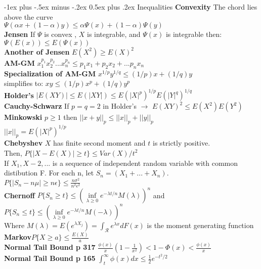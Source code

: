 \documentclass[10pt,landscape]{article}
\makeatletter
\renewcommand{\section}{\@startsection{section}{1}{0mm}%
                                {-1ex plus -.5ex minus -.2ex}%
                                {0.5ex plus .2ex}%
                                {\normalfont\large\bfseries}}
\makeatother
\begin{document}
\begin{multicols*}{3}
\section{Inequalities}
\textbf{Convexity} The chord lies above the curve\\
$\Psi(\alpha x +(1-\alpha)y)\leq \alpha\Psi(x)+(1-\alpha)\Psi(y)$\\
\textbf{Jensen} If $\Psi$ is convex , $X$ is integrable, and $\Psi(x)$ is integrable then:
$\Psi(E(x))\leq E(\Psi(x))$\\
\textbf{Another of Jensen} $E(X^2)\geq E(X)^2$\\
\textbf{AM-GM} $ x_1^{p_1} x_2^{p_2}...x_n^{p_n}\leq p_1 x_1 +p_2 x_2 + ... p_n x_n$\\
\textbf{Specialization of AM-GM} $x^{1/p} y^{1/q} \leq (1/p) x +(1/q) y$\\
simplifies to: $ xy \leq (1/p) x^p +(1/q) y^p$\\
\textbf{Holder's} $|E(XY)| \leq E(|XY|) \leq E(|X|^p)^{1/p} E(|Y|^q)^{1/q}$\\ 
\textbf{Cauchy-Schwarz} If $p=q=2$ in Holder's $\rightarrow$ $E(XY)^2 \leq E(X^2)E(Y^2)$\\
\textbf{Minkowski} $p\geq 1$ then $ ||x+y||_p \leq ||x||_p + ||y||_p$\\
$||x||_p=E(|X|^p)^{1/p}$\\
\textbf{Chebyshev} $X$ has finite second moment and $t$ is strictly positive.\\
Then, $P\{|X-E(X)|\geq t\}\leq Var(X)/t^{2}$\\
If $X_1,X-2,...$ is a sequence of independent random variable with common distibution F. For each n, let $S_n=(X_1+...+X_n)$.\\
$P\{|S_n-n\mu|\geq n\epsilon\}\leq \frac{n\sigma^2}{n^2\epsilon^2}$\\
\textbf{Chernoff} $P\{S_n\geq t\} \leq (\inf\limits_{\lambda\geq 0} e^{-\lambda t/n}M(\lambda))^n $ and\\
$P\{S_n\leq t\} \leq (\inf\limits_{\lambda\geq 0} e^{-\lambda t/n}M(-\lambda))^n $\\ 
Where $M(\lambda)=E(e^{\lambda X_j})=\int_{\mathcal{R}} e^{\lambda x}dF(x)$ is the moment generating function\\
\textbf{Markov}$P\{X\geq a\} \leq \frac {E(X)}{a}$\\
\textbf{Normal Tail Bound p 317} $\frac{\phi(x)}{x}(1-\frac{1}{x^2}) < 1- \Phi(x) < \frac {\phi(x)}{x} $\\
\textbf{Normal Tail Bound p 165} $\int_{t}^{\infty}\phi(x) dx \leq \frac{1}{2}e^{-t^2/2}$

\end{multicols*}
\end{document}
